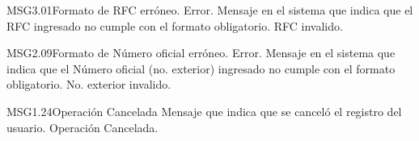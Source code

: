 \begin{Message}{MSG3.01}{Formato de RFC erróneo.}
	\MSGitem[Tipo:] Error.	
	\MSGitem[Objetivo:] Mensaje en el sistema que indica que el RFC ingresado no cumple con el formato obligatorio.
	\MSGitem[Redacción:] RFC invalido.
\end{Message}

\begin{Message}{MSG2.09}{Formato de Número oficial  erróneo.}
	\MSGitem[Tipo:] Error.	
	\MSGitem[Objetivo:] Mensaje en el sistema que indica que el Número oficial (no. exterior) ingresado no cumple con el formato obligatorio.
	\MSGitem[Redacción:] No. exterior invalido.
\end{Message}




  




\begin{Message}{MSG1.24}{Operación Cancelada}
	\MSGitem[Tipo:] 
	\MSGitem[Objetivo:] Mensaje que indica que se canceló el registro del usuario.
	\MSGitem[Redacción:] Operación Cancelada.
\end{Message}

